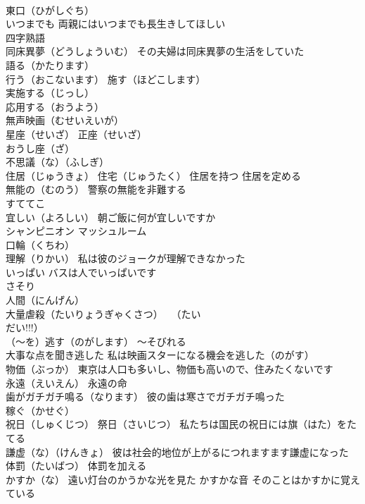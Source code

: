 \documentclass[8pt]{extreport}
\begin{document}
\begin{CJK}{UTF8}{min}
\\	東口（ひがしぐち）
\\	いつまでも 両親にはいつまでも長生きしてほしい
\\	四字熟語 
\\	同床異夢（どうしょういむ） その夫婦は同床異夢の生活をしていた
\\	語る（かたります）
\\	行う（おこないます） 施す（ほどこします）
\\	実施する（じっし）
\\	応用する（おうよう）
\\	無声映画（むせいえいが）
\\	星座（せいざ） 正座（せいざ）
\\	おうし座（ざ）
\\	不思議（な）（ふしぎ）
\\	住居（じゅうきょ） 住宅（じゅうたく） 住居を持つ 住居を定める
\\	無能の（むのう） 警察の無能を非難する
\\	すててこ
\\	宜しい（よろしい） 朝ご飯に何が宜しいですか
\\	シャンピニオン マッシュルーム 
\\	口輪（くちわ）
\\	理解（りかい） 私は彼のジョークが理解できなかった
\\	いっぱい バスは人でいっぱいです
\\	さそり
\\	人間（にんげん）
\\	大量虐殺（たいりょうぎゃくさつ）　 （たい 
\\	だい!!!）
\\	（～を）逃す（のがします） ～そびれる 
\\	大事な点を聞き逃した 私は映画スターになる機会を逃した（のがす）
\\	物価（ぶっか） 東京は人口も多いし、物価も高いので、住みたくないです
\\	永遠（えいえん） 永遠の命
\\	歯がガチガチ鳴る（なります） 彼の歯は寒さでガチガチ鳴った
\\	稼ぐ（かせぐ）
\\	祝日（しゅくじつ） 祭日（さいじつ） 私たちは国民の祝日には旗（はた）をたてる
\\	謙虚（な）（けんきょ） 彼は社会的地位が上がるにつれますます謙虚になった
\\	体罰（たいばつ） 体罰を加える
\\	かすか（な） 遠い灯台のかうかな光を見た かすかな音 そのことはかすかに覚えている

\end{CJK}
\end{document}
